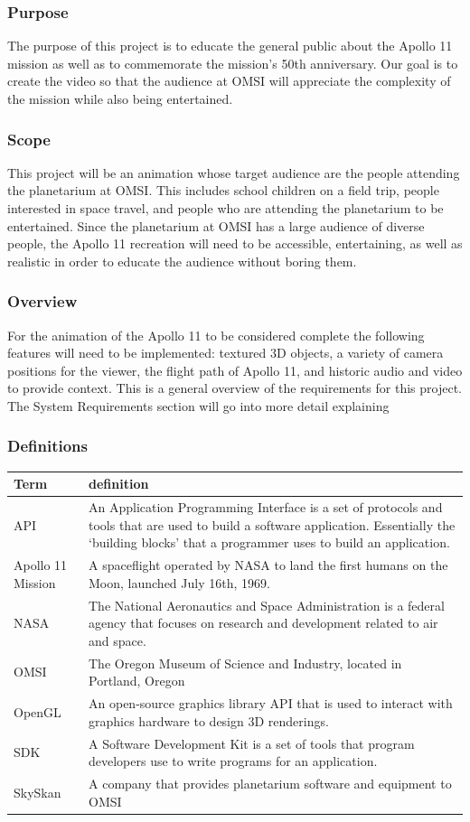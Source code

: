 \documentclass[onecolumn, draftclsnofoot,10pt, compsoc]{IEEEtran}
\begin{document}
    \subsubsection{Purpose}
    The purpose of this project is to educate the general public about the Apollo 11 mission as well as to commemorate the mission's 50th anniversary. Our goal is to create the video so that the audience at OMSI will appreciate the complexity of the mission while also being entertained. 
    \subsubsection{Scope}
    This project will be an animation whose target audience are the people attending the planetarium at OMSI. This includes school children on a field trip, people interested in space travel, and people who are attending the planetarium to be entertained. Since the planetarium at OMSI has a large audience of diverse people, the Apollo 11 recreation will need to be accessible, entertaining, as well as realistic in order to educate the audience without boring them.
    \subsubsection{Overview}
    For the animation of the Apollo 11 to be considered complete the following features will need to be implemented: textured 3D objects, a variety of camera positions for the viewer, the flight path of Apollo 11, and historic audio and video to provide context. This is a general overview of the requirements for this project. The System Requirements section will go into more detail explaining  
    \subsubsection{Definitions}
\begin{tabular} {|l|p{13.5cm}|}
    \hline
    Term & definition \\ \hline
    API & An Application Programming Interface is a set of protocols and tools that are used to build a software application. Essentially the `building blocks' that a programmer uses to build an application.  \\ \hline
    Apollo 11 Mission & A spaceflight operated by NASA to land the first humans on the Moon, launched July 16th, 1969.  \\ \hline
    NASA & The National Aeronautics and Space Administration is a federal agency that focuses on research and development related to air and space.	\\ \hline
    OMSI & The Oregon Museum of Science and Industry, located in Portland, Oregon	\\ \hline
    OpenGL & An open-source graphics library API that is used to interact with graphics hardware to design 3D renderings.	\\ \hline
    SDK & A Software Development Kit is a set of tools that program developers use to write programs for an application. \\ \hline
    SkySkan & A company that provides planetarium software and equipment to OMSI \\ \hline

\end{tabular}
\end{document}
